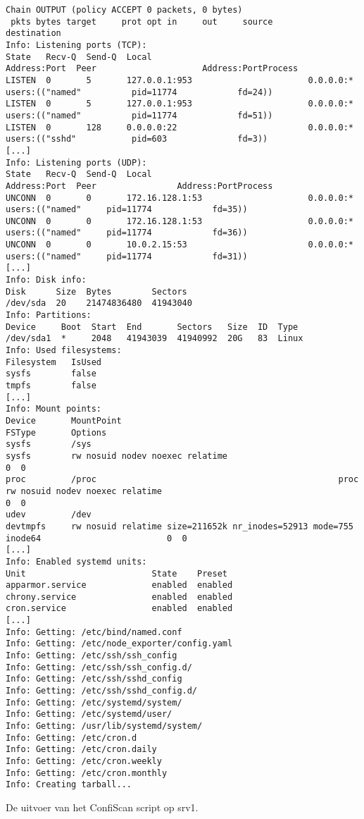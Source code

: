 \begin{longlisting}
\begin{verbatim}
Chain OUTPUT (policy ACCEPT 0 packets, 0 bytes)
 pkts bytes target     prot opt in     out     source               destination
Info: Listening ports (TCP):
State   Recv-Q  Send-Q  Local                               Address:Port  Peer                     Address:PortProcess
LISTEN  0       5       127.0.0.1:953                       0.0.0.0:*     users:(("named"          pid=11774            fd=24))
LISTEN  0       5       127.0.0.1:953                       0.0.0.0:*     users:(("named"          pid=11774            fd=51))
LISTEN  0       128     0.0.0.0:22                          0.0.0.0:*     users:(("sshd"           pid=603              fd=3))
[...]
Info: Listening ports (UDP):
State   Recv-Q  Send-Q  Local                               Address:Port  Peer                Address:PortProcess
UNCONN  0       0       172.16.128.1:53                     0.0.0.0:*     users:(("named"     pid=11774            fd=35))
UNCONN  0       0       172.16.128.1:53                     0.0.0.0:*     users:(("named"     pid=11774            fd=36))
UNCONN  0       0       10.0.2.15:53                        0.0.0.0:*     users:(("named"     pid=11774            fd=31))
[...]
Info: Disk info:
Disk      Size  Bytes        Sectors
/dev/sda  20    21474836480  41943040
Info: Partitions:
Device     Boot  Start  End       Sectors   Size  ID  Type
/dev/sda1  *     2048   41943039  41940992  20G   83  Linux
Info: Used filesystems:
Filesystem   IsUsed
sysfs        false
tmpfs        false
[...]
Info: Mount points:
Device       MountPoint                                           FSType       Options
sysfs        /sys                                                 sysfs        rw nosuid nodev noexec relatime                                                          0  0
proc         /proc                                                proc         rw nosuid nodev noexec relatime                                                          0  0
udev         /dev                                                 devtmpfs     rw nosuid relatime size=211652k nr_inodes=52913 mode=755 inode64                         0  0
[...]
Info: Enabled systemd units:
Unit                         State    Preset
apparmor.service             enabled  enabled
chrony.service               enabled  enabled
cron.service                 enabled  enabled
[...]
Info: Getting: /etc/bind/named.conf
Info: Getting: /etc/node_exporter/config.yaml
Info: Getting: /etc/ssh/ssh_config
Info: Getting: /etc/ssh/ssh_config.d/
Info: Getting: /etc/ssh/sshd_config
Info: Getting: /etc/ssh/sshd_config.d/
Info: Getting: /etc/systemd/system/
Info: Getting: /etc/systemd/user/
Info: Getting: /usr/lib/systemd/system/
Info: Getting: /etc/cron.d
Info: Getting: /etc/cron.daily
Info: Getting: /etc/cron.weekly
Info: Getting: /etc/cron.monthly
Info: Creating tarball...
  \end{verbatim}
  \caption[Uitvoer van ConfiScan op \texttt{srv1}.]{De uitvoer van het ConfiScan script op srv1.}
  \label{lst:bijlage-confiscan}
\end{longlisting}
